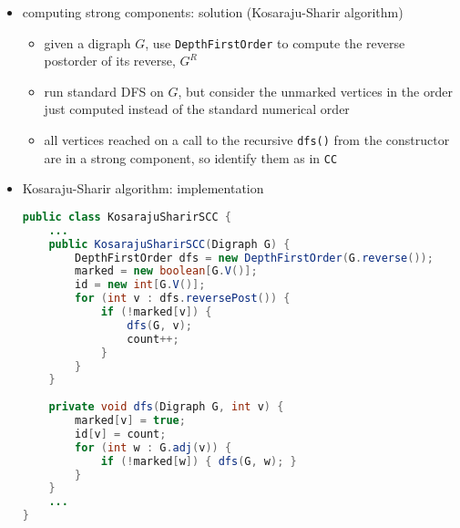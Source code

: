 \documentclass[8pt,a4paper,compress]{beamer}
\begin{document}
\begin{frame}[fragile]
\begin{itemize}
\item computing strong components: solution (Kosaraju-Sharir algorithm)
\begin{itemize}
\item given a digraph $G$, use \lstinline{DepthFirstOrder} to compute the reverse postorder of its reverse, $G^R$

\item run standard DFS on $G$, but consider the unmarked vertices in the order just computed instead of the standard numerical order

\item all vertices reached on a call to the recursive \lstinline{dfs()} from the constructor are in a strong component, so identify them as in \lstinline{CC}
\end{itemize}

\item Kosaraju-Sharir algorithm: implementation
\begin{lstlisting}[language=Java]
public class KosarajuSharirSCC {
    ...
    public KosarajuSharirSCC(Digraph G) {
        DepthFirstOrder dfs = new DepthFirstOrder(G.reverse());
        marked = new boolean[G.V()];
        id = new int[G.V()];
        for (int v : dfs.reversePost()) {
            if (!marked[v]) {
                dfs(G, v);
                count++;
            }
        }
    }
    
    private void dfs(Digraph G, int v) { 
        marked[v] = true;
        id[v] = count;
        for (int w : G.adj(v)) {
            if (!marked[w]) { dfs(G, w); }
        }
    }
    ...
}
\end{lstlisting}
\end{itemize}
\end{frame}
\end{document}
